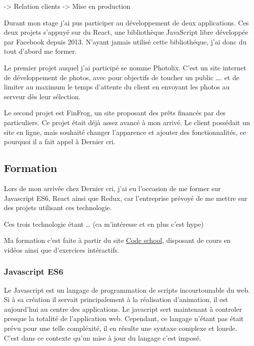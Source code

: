 \documentclass[12pt,a4paper]{article}
\begin{document}
  \bigskip

  -\textgreater{} Relation clients -\textgreater{} Mise en production

  Durant mon stage j'ai pus participer au développement de deux
  applications. Ces deux projets s'appuyé sur du React, une bibliothèque
  JavaScript libre développée par Facebook depuis 2013. N'ayant jamais
  utilisé cette bibliothéque, j'ai donc du tout d'abord me former.

  \bigskip

  Le premier projet auquel j'ai participé se nomme Photolix. C'est un site
  internet de développement de photos, avec pour objectifs de toucher un
  public \ldots{}. et de limiter au maximum le temps d'attente du client
  en envoyant les photos au serveur dès leur sélection.

  \bigskip

  Le second projet est FinFrog, un site proposant des prêts financés par
  des particuliers. Ce projet était déjà assez avancé à mon arrivé. Le
  client possédait un site en ligne, mais souhaité changer l'apparence et
  ajouter des fonctionnalités, ce pourquoi il a fait appel à Dernier cri.

  \subsection{Formation}\label{formation}

  \bigskip

  Lors de mon arrivée chez Dernier cri, j'ai eu l'occasion de me former
  sur Javascript ES6, React ainsi que Redux, car l'entreprise prévoyé de
  me mettre sur des projets utilisant ces technologie.

  \bigskip

  Ces trois technologie étant \ldots{} (ca m'intéresse et en plus c'est
  hype)

  \bigskip

  Ma formation c'est faite à partir du site
  \href{https://www.codeschool.com/}{Code school}, disposant de cours en
  vidéos ainsi que d'exercices intéractifs.

  \bigskip

  \subsubsection{Javascript ES6}\label{javascript-es6}

  \bigskip

  Le Javascript est un langage de programmation de scripts incourtounable
  du web. Si à sa création il servait principalement à la réalisation
  d'animation, il est aujourd'hui au centre des applications. Le javacript
  sert maintenant à controler presque la totalité de l'application web.
  Cependant, ce langage n'étant pas était prévu pour une telle compléxité,
  il en résulte une syntaxe complexe et lourde. C'est dans ce contexte
  qu'un mise à jour du langage c'est imposé.
\end{document}
